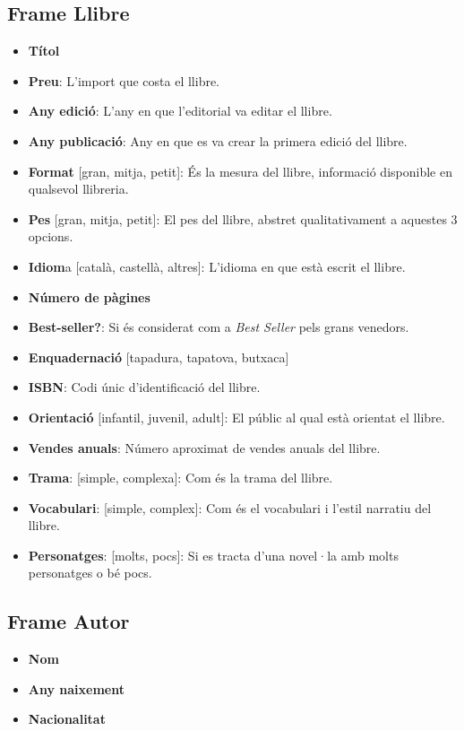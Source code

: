 \subsection{Frame Llibre}
\begin{itemize}
  \item \textbf{Títol}
  \item \textbf{Preu}: L'import que costa el llibre.
  \item \textbf{Any edició}: L'any en que l'editorial va editar el llibre.
  \item \textbf{Any publicació}: Any en que es va crear la primera edició del llibre.
  \item \textbf{Format} [gran, mitja, petit]: És la mesura del llibre, informació disponible en qualsevol llibreria.
  \item \textbf{Pes} [gran, mitja, petit]: El pes del llibre, abstret qualitativament a aquestes 3 opcions.
  \item \textbf{Idiom}a [català, castellà, altres]: L'idioma en que està escrit el llibre.
  \item \textbf{Número de pàgines}
  \item \textbf{Best-seller?}: Si és considerat com a \emph{Best Seller} pels grans venedors.
  \item \textbf{Enquadernació} [tapadura, tapatova, butxaca]
  \item \textbf{ISBN}: Codi únic d'identificació del llibre.
  \item \textbf{Orientació} [infantil, juvenil, adult]: El públic al qual està orientat el llibre.
  \item \textbf{Vendes anuals}: Número aproximat de vendes anuals del llibre.
  \item \textbf{Trama}: [simple, complexa]: Com és la trama del llibre.
  \item \textbf{Vocabulari}: [simple, complex]: Com és el vocabulari i l'estil narratiu del llibre.
  \item \textbf{Personatges}: [molts, pocs]: Si es tracta d'una novel·la amb molts personatges o bé pocs.
\end{itemize}

\subsection{Frame Autor}

\begin{itemize}
\item \textbf{Nom}
\item \textbf{Any naixement}
\item \textbf{Nacionalitat}
\end{itemize}

